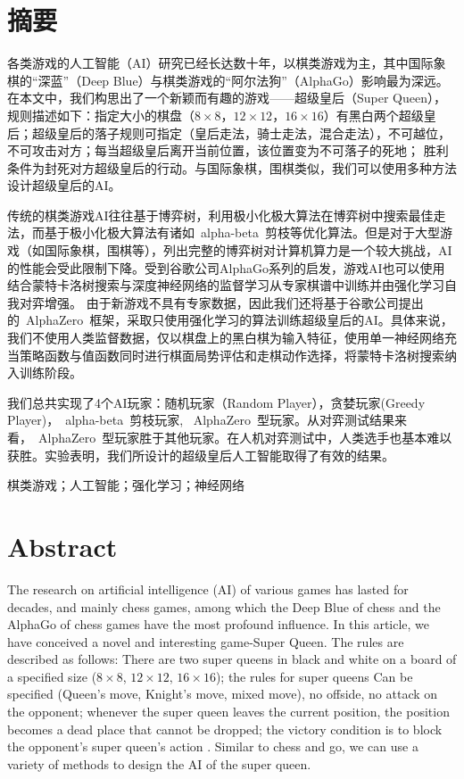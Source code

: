 \chapter*{摘要}

各类游戏的人工智能（AI）研究已经长达数十年，以棋类游戏为主，其中国际象棋的“深蓝”（Deep Blue）与棋类游戏的“阿尔法狗”（AlphaGo）影响最为深远。
在本文中，我们构思出了一个新颖而有趣的游戏——超级皇后（Super Queen），规则描述如下：指定大小的棋盘（$8\times8$，$12\times12$，$16\times16$）有黑白两个超级皇后；超级皇后的落子规则可指定（皇后走法，骑士走法，混合走法），不可越位，不可攻击对方；每当超级皇后离开当前位置，该位置变为不可落子的死地；
胜利条件为封死对方超级皇后的行动。与国际象棋，围棋类似，我们可以使用多种方法设计超级皇后的AI。


传统的棋类游戏AI往往基于博弈树，利用极小化极大算法在博弈树中搜索最佳走法，而基于极小化极大算法有诸如~alpha-beta~剪枝等优化算法。但是对于大型游戏（如国际象棋，围棋等），列出完整的博弈树对计算机算力是一个较大挑战，AI的性能会受此限制下降。受到谷歌公司AlphaGo系列的启发，游戏AI也可以使用结合蒙特卡洛树搜索与深度神经网络的监督学习从专家棋谱中训练并由强化学习自我对弈增强。
由于新游戏不具有专家数据，因此我们还将基于谷歌公司提出的~AlphaZero~框架，采取只使用强化学习的算法训练超级皇后的AI。具体来说，我们不使用人类监督数据，仅以棋盘上的黑白棋为输入特征，使用单一神经网络充当策略函数与值函数同时进行棋面局势评估和走棋动作选择，将蒙特卡洛树搜索纳入训练阶段。


我们总共实现了4个AI玩家：随机玩家（Random Player），贪婪玩家(Greedy Player)，~alpha-beta~剪枝玩家, ~AlphaZero~型玩家。从对弈测试结果来看，~AlphaZero~型玩家胜于其他玩家。在人机对弈测试中，人类选手也基本难以获胜。实验表明，我们所设计的超级皇后人工智能取得了有效的结果。

\medskip
{} 棋类游戏；人工智能；强化学习；神经网络

\chapter*{Abstract}

The research on artificial intelligence (AI) of various games has lasted for decades, and mainly chess games, among which the Deep Blue of chess and the AlphaGo of chess games have the most profound influence.
In this article, we have conceived a novel and interesting game-Super Queen. The rules are described as follows: There are two super queens in black and white on a board of a specified size ($8\times8$, $12\times12$, $16\times16$); the rules for super queens Can be specified (Queen's move, Knight's move, mixed move), no offside, no attack on the opponent; whenever the super queen leaves the current position, the position becomes a dead place that cannot be dropped; the victory condition is to block the opponent's super queen's action . Similar to chess and go, we can use a variety of methods to design the AI of the super queen.


